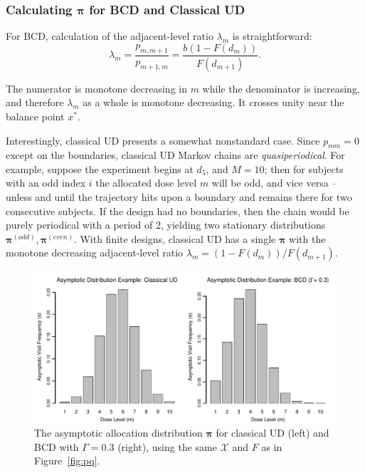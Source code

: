 \subsubsection{Calculating $\boldsymbol{\pi}$ for BCD and Classical UD}

For BCD, calculation of the adjacent-level ratio $\lambda_m$ is straightforward:
\begin{equation}\label{eq:BCDlambda}
\lambda_m=\frac{p_{m,m+1}}{p_{m+1,m}}=\frac{b\left(1-F(d_m)\right)}{F(d_{m+1})}.
\end{equation}

\noindent The numerator is monotone decreasing in $m$ while the denominator is increasing, and therefore $\lambda_m$ as a whole is monotone decreasing. It crosses unity near the balance point $x^*$.

Interestingly, classical UD presents a somewhat nonstandard case. Since $p_{mm}=0$ except on the boundaries, classical UD Markov chains are \emph{quasiperiodical}. For example, suppose the experiment begins at $d_5$, and $M=10$; then for subjects with an odd index $i$ the allocated dose level $m$ will be odd, and vice versa -- unless and until the trajectory hits upon a boundary and remains there for two consecutive subjects. If the design had no boundaries, then the chain would be purely periodical with a period of 2, yielding two stationary distributions $\boldsymbol{\pi}^{(odd)},\boldsymbol{\pi}^{(even)}$. With finite designs, classical UD has a single $\boldsymbol{\pi}$ with the monotone decreasing adjacent-level ratio $\lambda_m=\left(1-F(d_m)\right)/F(d_{m+1})$. 

\begin{figure}
\begin{center}
\includegraphics[scale=0.55]{pifig}
\caption{The asymptotic allocation distribution $\boldsymbol{\pi}$ for classical UD (left) and BCD with $\Gamma=0.3$ (right), using the same $\mathcal{X}$ and $F$ as in Figure~\ref{fig:pq}.}\label{fig:pi}
\end{center}
\end{figure}

